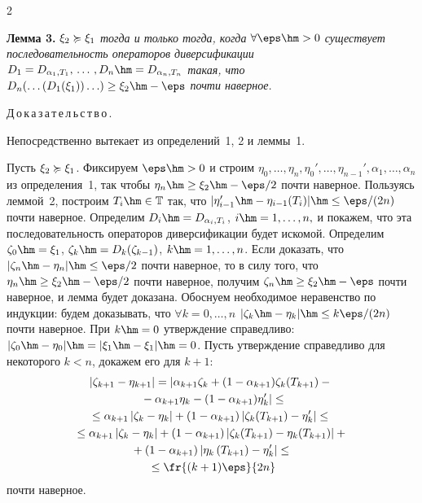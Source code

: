 \begin{multicols}{2}
\medskip

\noindent
\textbf{Лемма 3.} \textit{$\xi_2 \succcurlyeq \xi_1$ тогда и только тогда, когда $
\forall \eps\hm>0 $ существует последовательность операторов
диверсификации $ D_1=D_{\alpha_1,T_1},\, \ldots\, ,
D_n\hm=D_{\alpha_n,T_n} $ такая, что $ D_n(\ldots(D_1(\xi_1))\ldots)
\ge \xi_2 \hm- \eps $ почти наверное.}

\medskip

\noindent
Д\,о\,к\,а\,з\,а\,т\,е\,л\,ь\,с\,т\,в\,о\,.\

\noindent
\fbox{$\Leftarrow$} Непосредственно вытекает из определений~1, 2 и леммы~1.

\noindent
\fbox{$\Rightarrow$} Пусть $\xi_2 \succcurlyeq \xi_1$. Фиксируем $\eps
\hm> 0$ и строим $\eta_0, \ldots , \eta_n, \eta_0', \ldots,
\eta_{n-1}', \alpha_1, \ldots, \alpha_n$ из определения~1, так чтобы
$ \eta_n \hm\ge \xi_2 \hm- \eps/2 $ почти наверное. Пользуясь
леммой~2, построим $ T_i \hm\in \classT $ так, что $ | \eta_{i-1}' \hm-
\eta_{i-1}(T_i) | \hm\le \eps/(2n) $ почти наверное. Определим
$D_i \hm= D_{\alpha_i,T_i}$, $i \hm=1,\ldots,n,$ и покажем, что эта
последовательность операторов диверсификации будет искомой.
Определим $\zeta_0 \hm= \xi_1$, $\zeta_k \hm= D_k(\zeta_{k-1})$, $k \hm=
1,\ldots,n$. Если доказать, что $ | \zeta_n \hm- \eta_n | \hm\le
\eps/2$ почти наверное, то в силу того, что $ \eta_n \hm\ge
\xi_2 \hm- \eps/2 $ почти наверное, получим $ \zeta_n \hm\ge \xi_2
\hm- \eps $ почти наверное, и лемма будет доказана. Обоснуем
необходимое неравенство по индукции: будем доказывать, что $\forall
k=0,\dots,n$ $| \zeta_k \hm- \eta_k | \hm\le k \eps/(2n)$ почти
наверное. При $k\hm=0$ утверждение справедливо: $|\zeta_0 \hm- \eta_0| \hm=
|\xi_1 \hm- \xi_1| \hm= 0 $. Пусть утверждение справедливо для некоторого
$k<n$, докажем его для $k+1$:
\begin{multline*}
\left\vert \zeta_{k+1} - \eta_{k+1} \right\vert = 
\left\vert\alpha_{k+1}\zeta_k + (1-\alpha_{k+1})\zeta_k(T_{k+1}) -{}\right.\\
\left.{}-  \alpha_{k+1}\eta_k -                  (1-\alpha_{k+1})\eta_k' \right\vert \le \\
\le \alpha_{k+1} \left\vert \zeta_k - \eta_k \right\vert 
+ \left(1-\alpha_{k+1}\right) \left\vert\zeta_k(T_{k+1}) - \eta_k'\right\vert \le {}\\
\!{}\le \alpha_{k+1} \left| \zeta_k - \eta_k \right| + \left(1-\alpha_{k+1}\right) 
\left\vert\zeta_k(T_{k+1}) - \eta_k(T_{k+1})\right\vert +{}\\
{}+    \left(1-\alpha_{k+1}\right) \left\vert\eta_k\left(T_{k+1}\right) - \eta_k'\right\vert \le{} \\
{}\le \fr{(k+1)\eps}{2n} 
\end{multline*}
почти наверное.


\end{multicols}
